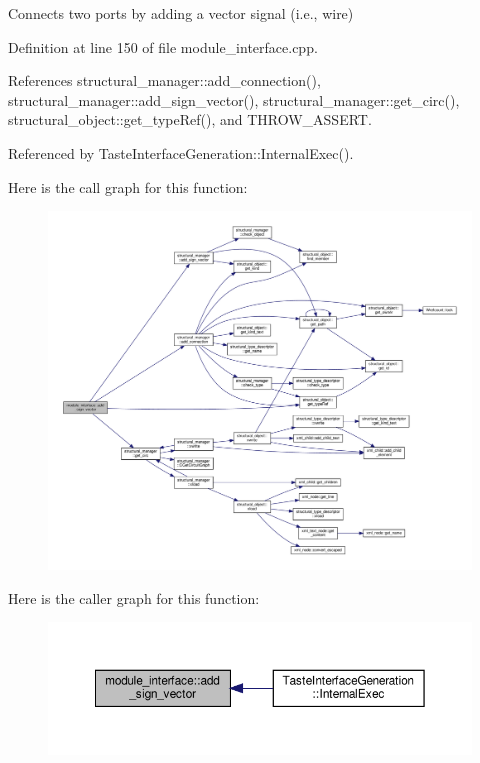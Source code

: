 Connects two ports by adding a vector signal (i.\+e., wire) 



Definition at line 150 of file module\+\_\+interface.\+cpp.



References structural\+\_\+manager\+::add\+\_\+connection(), structural\+\_\+manager\+::add\+\_\+sign\+\_\+vector(), structural\+\_\+manager\+::get\+\_\+circ(), structural\+\_\+object\+::get\+\_\+type\+Ref(), and T\+H\+R\+O\+W\+\_\+\+A\+S\+S\+E\+RT.



Referenced by Taste\+Interface\+Generation\+::\+Internal\+Exec().

Here is the call graph for this function\+:
\nopagebreak
\begin{figure}[H]
\begin{center}
\leavevmode
\includegraphics[width=350pt]{d9/d0e/classmodule__interface_a07e4684bc7c049dde53a1b1ab7fa450e_cgraph}
\end{center}
\end{figure}
Here is the caller graph for this function\+:
\nopagebreak
\begin{figure}[H]
\begin{center}
\leavevmode
\includegraphics[width=350pt]{d9/d0e/classmodule__interface_a07e4684bc7c049dde53a1b1ab7fa450e_icgraph}
\end{center}
\end{figure}
\mbox{\label{classmodule__interface_a2b729018fc92ed9b1b7c9453af47f8f1}} 
